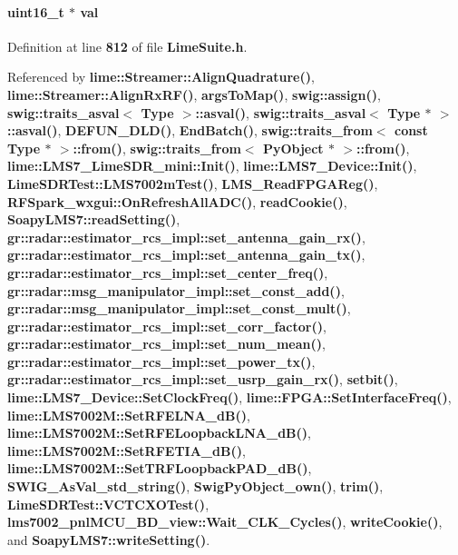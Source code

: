 \paragraph[{val}]{\setlength{\rightskip}{0pt plus 5cm}uint16\+\_\+t $\ast$ val}\label{group__FN__LOW__LVL_gaa4f209c056c387c044201ffd5e668ffa}


Definition at line {\bf 812} of file {\bf Lime\+Suite.\+h}.



Referenced by {\bf lime\+::\+Streamer\+::\+Align\+Quadrature()}, {\bf lime\+::\+Streamer\+::\+Align\+Rx\+R\+F()}, {\bf args\+To\+Map()}, {\bf swig\+::assign()}, {\bf swig\+::traits\+\_\+asval$<$ Type $>$\+::asval()}, {\bf swig\+::traits\+\_\+asval$<$ Type $\ast$ $>$\+::asval()}, {\bf D\+E\+F\+U\+N\+\_\+\+D\+L\+D()}, {\bf End\+Batch()}, {\bf swig\+::traits\+\_\+from$<$ const Type $\ast$ $>$\+::from()}, {\bf swig\+::traits\+\_\+from$<$ Py\+Object $\ast$ $>$\+::from()}, {\bf lime\+::\+L\+M\+S7\+\_\+\+Lime\+S\+D\+R\+\_\+mini\+::\+Init()}, {\bf lime\+::\+L\+M\+S7\+\_\+\+Device\+::\+Init()}, {\bf Lime\+S\+D\+R\+Test\+::\+L\+M\+S7002m\+Test()}, {\bf L\+M\+S\+\_\+\+Read\+F\+P\+G\+A\+Reg()}, {\bf R\+F\+Spark\+\_\+wxgui\+::\+On\+Refresh\+All\+A\+D\+C()}, {\bf read\+Cookie()}, {\bf Soapy\+L\+M\+S7\+::read\+Setting()}, {\bf gr\+::radar\+::estimator\+\_\+rcs\+\_\+impl\+::set\+\_\+antenna\+\_\+gain\+\_\+rx()}, {\bf gr\+::radar\+::estimator\+\_\+rcs\+\_\+impl\+::set\+\_\+antenna\+\_\+gain\+\_\+tx()}, {\bf gr\+::radar\+::estimator\+\_\+rcs\+\_\+impl\+::set\+\_\+center\+\_\+freq()}, {\bf gr\+::radar\+::msg\+\_\+manipulator\+\_\+impl\+::set\+\_\+const\+\_\+add()}, {\bf gr\+::radar\+::msg\+\_\+manipulator\+\_\+impl\+::set\+\_\+const\+\_\+mult()}, {\bf gr\+::radar\+::estimator\+\_\+rcs\+\_\+impl\+::set\+\_\+corr\+\_\+factor()}, {\bf gr\+::radar\+::estimator\+\_\+rcs\+\_\+impl\+::set\+\_\+num\+\_\+mean()}, {\bf gr\+::radar\+::estimator\+\_\+rcs\+\_\+impl\+::set\+\_\+power\+\_\+tx()}, {\bf gr\+::radar\+::estimator\+\_\+rcs\+\_\+impl\+::set\+\_\+usrp\+\_\+gain\+\_\+rx()}, {\bf setbit()}, {\bf lime\+::\+L\+M\+S7\+\_\+\+Device\+::\+Set\+Clock\+Freq()}, {\bf lime\+::\+F\+P\+G\+A\+::\+Set\+Interface\+Freq()}, {\bf lime\+::\+L\+M\+S7002\+M\+::\+Set\+R\+F\+E\+L\+N\+A\+\_\+d\+B()}, {\bf lime\+::\+L\+M\+S7002\+M\+::\+Set\+R\+F\+E\+Loopback\+L\+N\+A\+\_\+d\+B()}, {\bf lime\+::\+L\+M\+S7002\+M\+::\+Set\+R\+F\+E\+T\+I\+A\+\_\+d\+B()}, {\bf lime\+::\+L\+M\+S7002\+M\+::\+Set\+T\+R\+F\+Loopback\+P\+A\+D\+\_\+d\+B()}, {\bf S\+W\+I\+G\+\_\+\+As\+Val\+\_\+std\+\_\+string()}, {\bf Swig\+Py\+Object\+\_\+own()}, {\bf trim()}, {\bf Lime\+S\+D\+R\+Test\+::\+V\+C\+T\+C\+X\+O\+Test()}, {\bf lms7002\+\_\+pnl\+M\+C\+U\+\_\+\+B\+D\+\_\+view\+::\+Wait\+\_\+\+C\+L\+K\+\_\+\+Cycles()}, {\bf write\+Cookie()}, and {\bf Soapy\+L\+M\+S7\+::write\+Setting()}.

